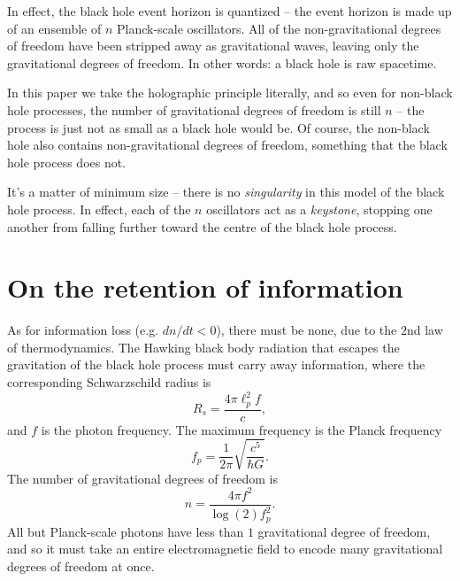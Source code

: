 \documentclass[12pt]{article}
\begin{document}
In effect, the black hole event horizon is quantized -- the event horizon is made up of an ensemble of $n$ Planck-scale oscillators.
All of the non-gravitational degrees of freedom have been stripped away as gravitational waves, leaving only the gravitational degrees of freedom.
In other words: a black hole is raw spacetime.

In this paper we take the holographic principle literally, and so even for non-black hole processes, the number of gravitational degrees of freedom is still $n$ -- the process is just not as small as a black hole would be.
Of course, the non-black hole also contains non-gravitational degrees of freedom, something that the black hole process does not.

It's a matter of minimum size -- there is no {\textit{singularity}} in this model of the black hole process.
In effect, each of the $n$ oscillators act as a {\textit{keystone}}, stopping one another from falling further toward the centre of the black hole process.







\section{On the retention of information}

As for information loss (e.g. $dn / dt < 0$), there must be none, due to the $2$nd law of thermodynamics.
The Hawking black body radiation that escapes the gravitation of the black hole process must carry away information, where the corresponding Schwarzschild radius is
\begin{equation}
R_s = \frac{4 \pi \ell_p^2 f}{c},
\end{equation}
and $f$ is the photon frequency.
The maximum frequency is the Planck frequency
\begin{equation}
f_p = \frac{1}{2 \pi} \sqrt{\frac{c^5}{\hbar G}}.
\end{equation}
The number of gravitational degrees of freedom is
\begin{equation}
n = \frac{4 \pi f^2}{\log(2) f_p^2}.%
\end{equation}
All but Planck-scale photons have less than $1$ gravitational degree of freedom, and so it must take an entire electromagnetic field to encode many gravitational degrees of freedom at once.
\end{document}
